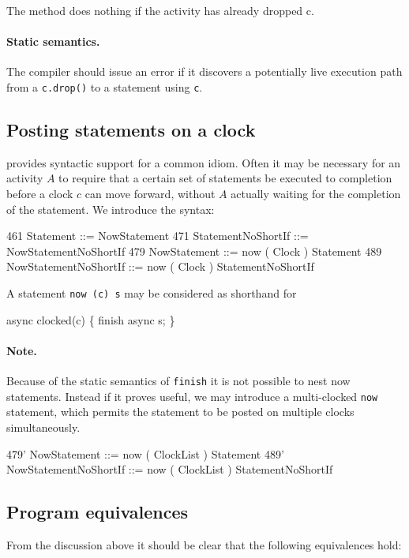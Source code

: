 \noindent{} 
The method does nothing if the activity has already dropped {\cf c}. 

\paragraph{Static semantics.}
The compiler should issue an error if it discovers a potentially live
execution path from a {\tt c.drop()} to a statement using {\tt c}.

\subsection{Posting statements on a clock}
\Xten{} provides syntactic support for a common idiom. Often it may be
necessary for an activity $A$ to require that a certain set of
statements be executed to completion before a clock $c$ can move
forward, without $A$ actually waiting for the completion
of the statement. We introduce the syntax:
\begin{x10}
461 Statement ::= NowStatement
471 StatementNoShortIf ::= 
       NowStatementNoShortIf
479 NowStatement ::= 
       now ( Clock ) Statement
489 NowStatementNoShortIf ::= 
       now ( Clock ) StatementNoShortIf
\end{x10}
\noindent 

A statement {\tt now (c) s} may be considered as shorthand for
\begin{x10}
  async clocked(c) \{ 
     finish async s; 
  \}
\end{x10}

\paragraph{Note.} Because of the static semantics of {\tt finish}
it is not possible to nest {\cf now} statements. Instead if it proves
useful, we may introduce a multi-clocked {\tt now} statement,
which permits the statement to be posted on multiple clocks
simultaneously.
\begin{x10}
479' NowStatement ::= 
       now ( ClockList ) Statement
489' NowStatementNoShortIf ::= 
       now ( ClockList ) StatementNoShortIf  
\end{x10}

\subsection{Program equivalences}

From the discussion above it should be clear that the following
equivalences hold:

